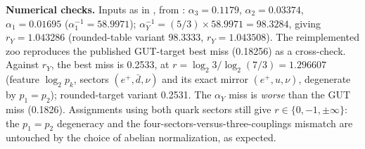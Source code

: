 \documentclass[11pt]{article}
\newcommand{\rY}{r_{Y}}
\begin{document}
\textbf{Numerical checks.} Inputs as in \cite{companion}, from \cite{pdg}: $\alpha_3 = 0.1179$, $\alpha_2 = 0.03374$, $\alpha_1 = 0.01695$ ($\alpha_1^{-1} = 58.9971$); $\alpha_Y^{-1} = (5/3) \times 58.9971 = 98.3284$, giving $\rY = 1.043286$ (rounded-table variant 98.3333, $\rY = 1.043508$). The reimplemented zoo reproduces the published GUT-target best miss (0.18256) as a cross-check. Against $\rY$, the best miss is 0.2533, at $r = \log_2 3 / \log_2(7/3) = 1.296607$ (feature $\log_2 p_k$, sectors $(e^+, \bar d, \nu)$ and its exact mirror $(e^+, u, \nu)$, degenerate by $p_1 = p_2$); rounded-target variant 0.2531. The $\alpha_Y$ miss is \emph{worse} than the GUT miss (0.1826). Assignments using both quark sectors still give $r \in \{0, -1, \pm\infty\}$: the $p_1 = p_2$ degeneracy and the four-sectors-versus-three-couplings mismatch are untouched by the choice of abelian normalization, as expected.
\end{document}
